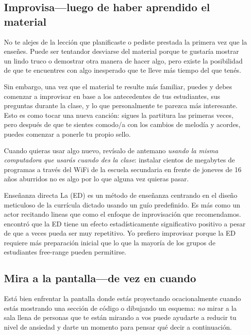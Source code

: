 \subsection*{Improvisa---luego de haber aprendido el material}

No te alejes de la lección que planificaste o pediste prestada la primera vez que la enseñes.
Puede ser tentandor desviarse del material
porque te gustaría mostrar un lindo truco o demostrar otra manera de hacer algo,
pero existe la posibilidad de que te encuentres con algo inesperado 
que te lleve más tiempo del que tenés.

Sin embargo, una vez que el material te resulte más familiar,
puedes y debes comenzar a improvisar en base a los antecedentes de tus estudiantes,
sus preguntas durante la clase,
y lo que personalmente te parezca más interesante.
Esto es como tocar una nueva canción:
sigues la partitura las primeras veces,
pero después de que te sientes comodo/a con los cambios de melodía y acordes,
puedes comenzar a ponerle tu propio sello.

Cuando quieras usar algo nuevo,
revísalo de antemano
\emph{usando la misma computadora que usarás cuando des la clase}:
instalar cientos de megabytes de programas a través del WiFi de la escuela secundaria
en frente de joneves de 16 años aburridos no es algo por lo que alguna vez quieras pasar.

\begin{aside}{Enseñanza directa}
  La  (ED) es un método de enseñanza
  centrando en el diseño meticuloso de la currícula dictado usando un guío predefinido.
  Es más como un actor recitando lineas que como el enfoque de inprovisación que recomendamos.
  \cite{Stoc2018} encontró que la ED tiene un efecto estadísticamente significativo positivo 
  a pesar de que a veces pueda ser muy repetitivo.
  Yo prefiero improvisar porque la ED requiere más preparación inicial que lo que la mayoría 
  de los grupos de estudiantes free-range pueden permitirse.
\end{aside}

\subsection*{Mira a la pantalla---de vez en cuando}

Está bien enfrentar la pantalla donde estás proyectando ocacionalmente
cuando estás mostrando una sección de código o dibujando un esquema:
\emph{no} mirar a la sala llena de personas que te están mirando a vos
puede ayudarte a reducir tu nivel de ansiedad y darte un momento para pensar qué decir a continuación.

